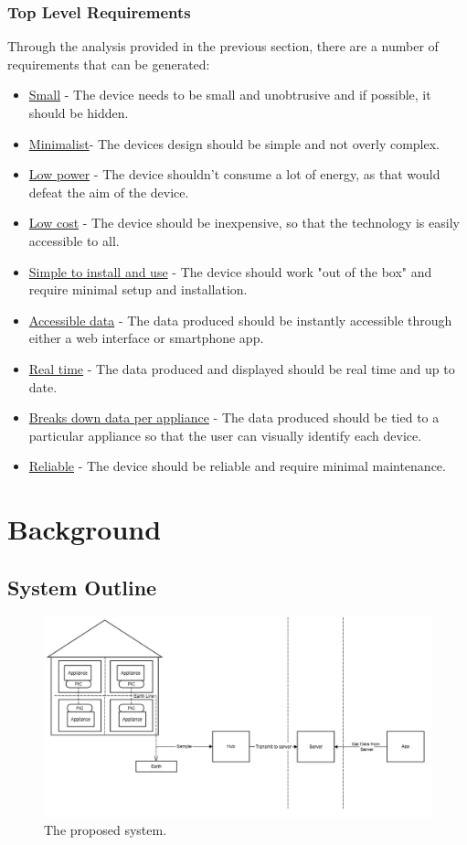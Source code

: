 \documentclass[preprint,12pt,3p]{elsarticle}
\begin{document}
\subsubsection{Top Level Requirements}

Through the analysis provided in the previous section, there are a number of requirements that can be generated:

\begin{itemize}
  \item \underline{Small} - The device needs to be small and unobtrusive and if possible, it should be hidden.
  \item \underline{Minimalist}- The devices design should be simple and not overly complex.
  \item \underline{Low power} - The device shouldn't consume a lot of energy, as that would defeat the aim of the device.
  \item \underline{Low cost} - The device should be inexpensive, so that the technology is easily accessible to all.
  \item \underline{Simple to install and use} - The device should work "out of the box" and require minimal setup and installation.
  \item \underline{Accessible data}  - The data produced should be instantly accessible through either a web interface or smartphone app.
  \item \underline{Real time} - The data produced and displayed should be real time and up to date.
  \item \underline{Breaks down data per appliance} - The data produced should be tied to a particular appliance so that the user can visually identify each device.
  \item \underline{Reliable} - The device should be reliable and require minimal maintenance.
\end{itemize}

\clearpage
\section{Background}
\subsection{System Outline}
\begin{figure}[H]
    \centering
    \includegraphics[width=\columnwidth]{diagrams/overalldescript}
    \caption {The proposed system.}
\end{figure}
\end{document}
